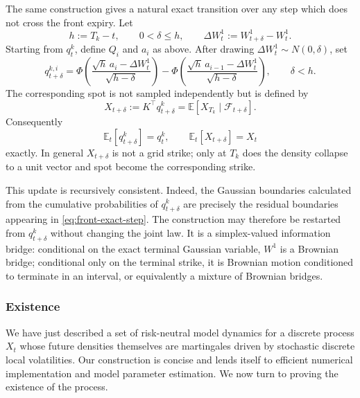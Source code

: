 \documentclass[11pt]{article}
\theoremstyle{plain}
\theoremstyle{definition}
\theoremstyle{remark}
\begin{document}
  The same construction gives a natural exact transition over any step which
  does not cross the front expiry. Let
  \[
    h:=T_k-t,
    \qquad 0<\delta\leq h,
    \qquad \Delta W_t^1:=W_{t+\delta}^1-W_t^1.
  \]
  Starting from $q_t^k$, define $Q_i$ and $a_i$ as above. After drawing
  $\Delta W_t^1\sim N(0,\delta)$, set
  \begin{equation}
    \label{eq:front-exact-step}
    q_{t+\delta}^{k,i}
      =\Phi\!\left(
          \frac{\sqrt h\,a_i-\Delta W_t^1}{\sqrt{h-\delta}}
        \right)
       -\Phi\!\left(
          \frac{\sqrt h\,a_{i-1}-\Delta W_t^1}{\sqrt{h-\delta}}
        \right),
    \qquad \delta<h.
  \end{equation}
  The corresponding spot is not sampled independently but is defined by
  \begin{equation}
    \label{eq:spot-exact-step}
    X_{t+\delta}:=K^\top q_{t+\delta}^k
      =\mathbb E\!\left[X_{T_k}\mid\mathcal F_{t+\delta}\right].
  \end{equation}
  Consequently
  \[
    \mathbb E_t[q_{t+\delta}^k]=q_t^k,
    \qquad
    \mathbb E_t[X_{t+\delta}]=X_t
  \]
  exactly. In general $X_{t+\delta}$ is not a grid strike; only at $T_k$ does
  the density collapse to a unit vector and spot become the corresponding
  strike.

  This update is recursively consistent. Indeed, the Gaussian boundaries
  calculated from the cumulative probabilities of $q_{t+\delta}^k$ are
  precisely the residual boundaries appearing in
  \eqref{eq:front-exact-step}. The construction may therefore be restarted
  from $q_{t+\delta}^k$ without changing the joint law. It is a
  simplex-valued information bridge: conditional on the exact terminal
  Gaussian variable, $W^1$ is a Brownian bridge; conditional only on the
  terminal strike, it is Brownian motion conditioned to terminate in an
  interval, or equivalently a mixture of Brownian bridges.

\subsubsection{Existence}
\label{sec:existence}
We have just described a set of risk-neutral model dynamics for a discrete process $X_t$ whose future densities themselves are martingales driven by stochastic discrete local volatilities. Our construction is concise and lends itself to efficient numerical implementation and model parameter estimation. We now turn to proving the existence of the process. 
\end{document}
